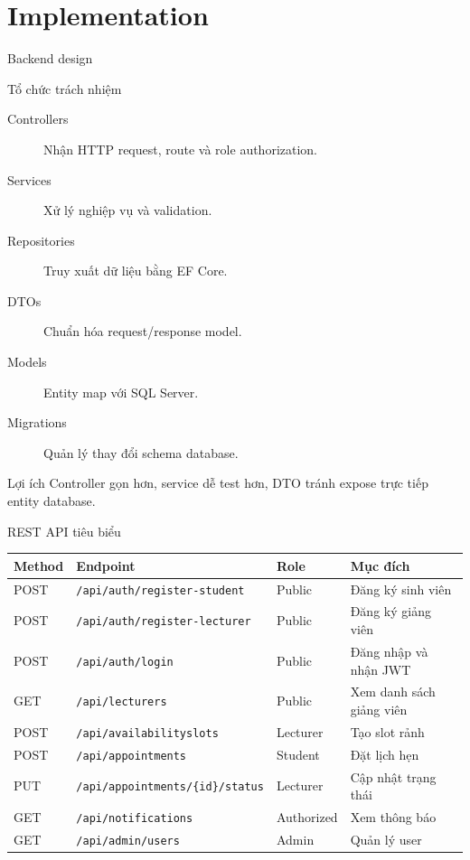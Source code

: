 \documentclass[aspectratio=169,11pt]{beamer}
\begin{document}
\section{Implementation}

\begin{frame}{Backend design}
  \begin{block}{Tổ chức trách nhiệm}
    \begin{description}
      \item[Controllers] Nhận HTTP request, route và role authorization.
      \item[Services] Xử lý nghiệp vụ và validation.
      \item[Repositories] Truy xuất dữ liệu bằng EF Core.
      \item[DTOs] Chuẩn hóa request/response model.
      \item[Models] Entity map với SQL Server.
      \item[Migrations] Quản lý thay đổi schema database.
    \end{description}
  \end{block}

  \begin{alertblock}{Lợi ích}
    Controller gọn hơn, service dễ test hơn, DTO tránh expose trực tiếp entity database.
  \end{alertblock}
\end{frame}

\begin{frame}{REST API tiêu biểu}
  \scriptsize
  \begin{tabular}{p{} p{} p{} p{}}
    \toprule
    \textbf{Method} & \textbf{Endpoint} & \textbf{Role} & \textbf{Mục đích} \\
    \midrule
    POST & \texttt{/api/auth/register-student} & Public & Đăng ký sinh viên \\
    POST & \texttt{/api/auth/register-lecturer} & Public & Đăng ký giảng viên \\
    POST & \texttt{/api/auth/login} & Public & Đăng nhập và nhận JWT \\
    GET & \texttt{/api/lecturers} & Public & Xem danh sách giảng viên \\
    POST & \texttt{/api/availabilityslots} & Lecturer & Tạo slot rảnh \\
    POST & \texttt{/api/appointments} & Student & Đặt lịch hẹn \\
    PUT & \texttt{/api/appointments/\{id\}/status} & Lecturer & Cập nhật trạng thái \\
    GET & \texttt{/api/notifications} & Authorized & Xem thông báo \\
    GET & \texttt{/api/admin/users} & Admin & Quản lý user \\
    \bottomrule
  \end{tabular}
\end{frame}
\end{document}
